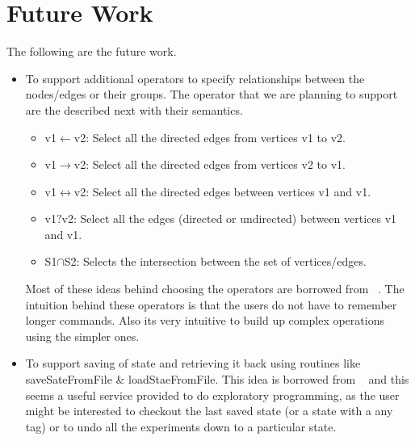 \documentclass[12,twoside]{article}
\begin{document}
\section{Future Work}
The following are the future work.
  \begin{itemize}
    \item To support  additional operators to specify relationships between the 
      nodes/edges or their groups. The operator that we are planning to support 
      are the described next with their semantics.

    \begin{itemize}
      \item v1$\leftarrow$v2: Select all the directed edges from vertices v1 to 
        v2.
      \item v1$\rightarrow$v2: Select all the directed edges from vertices v2 to 
      v1.
      \item v1$\leftrightarrow$v2: Select all the directed edges between 
      vertices v1 and v1.
      \item v1$?$v2: Select all the edges (directed or undirected) between 
      vertices v1 and v1.
      \item S1$\cap$S2: Selects the intersection between the set of
      vertices/edges.
    \end{itemize}
      Most of these ideas behind choosing the operators are borrowed from 
        ~\cite{Adar}. The intuition behind these operators is that the users do 
        not have to remember longer commands. Also its very intuitive to build 
        up complex operations using the simpler ones.

    \item To support saving of state and retrieving it back using
    routines like saveSateFromFile \& loadStaeFromFile.
    This idea is borrowed from ~\cite{Adar} and this seems a useful service 
    provided to do exploratory programming, as the user might be interested to 
    checkout the last saved state  (or a state with a any tag) or to undo all 
    the experiments down to a particular state.

  \end{itemize}
\end{document}
